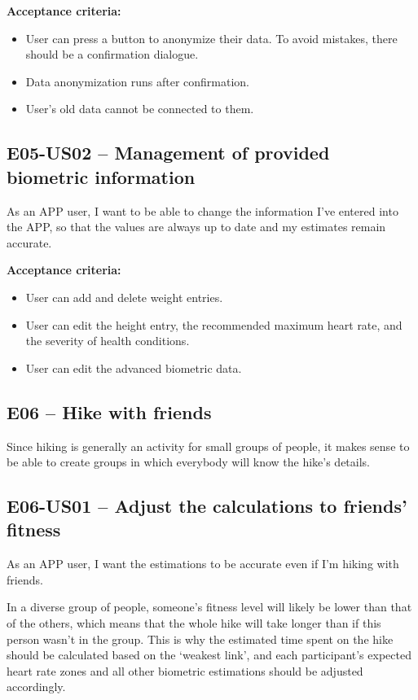 \textbf{Acceptance criteria:}
\begin{itemize}
    \item User can press a button to anonymize their data. To avoid mistakes, there should be a confirmation dialogue.
    \item Data anonymization runs after confirmation.
    \item User's old data cannot be connected to them.
\end{itemize}

\subsection*{E05-US02 -- Management of provided biometric information}
As an APP user, I want to be able to change the information I've entered into the APP, so that the values are always up to date and my estimates remain accurate.

\textbf{Acceptance criteria:}
\begin{itemize}
    \item User can add and delete weight entries.
    \item User can edit the height entry, the recommended maximum heart rate, and the severity of health conditions.
    \item User can edit the advanced biometric data.
\end{itemize}



\subsection*{E06 -- Hike with friends}

Since hiking is generally an activity for small groups of people, it makes sense to be able to create groups in which everybody will know the hike's details.

\subsection*{E06-US01 -- Adjust the calculations to friends' fitness}
As an APP user, I want the estimations to be accurate even if I'm hiking with friends.

In a diverse group of people, someone's fitness level will likely be lower than that of the others, which means that the whole hike will take longer than if this person wasn't in the group.
This is why the estimated time spent on the hike should be calculated based on the `weakest link', and each participant's expected heart rate zones and all other biometric estimations should be adjusted accordingly.


